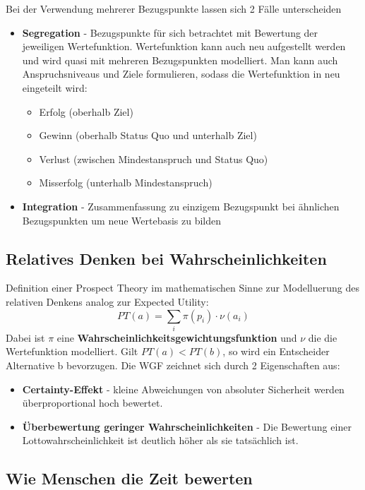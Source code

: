 Bei der Verwendung mehrerer Bezugspunkte lassen sich 2 Fälle unterscheiden
\begin{itemize}
    \item \textbf{Segregation} - Bezugspunkte für sich betrachtet mit
        Bewertung der jeweiligen Wertefunktion. Wertefunktion kann auch
        neu aufgestellt werden und wird quasi mit mehreren Bezugspunkten
        modelliert. Man kann auch Anspruchsniveaus und Ziele formulieren,
        sodass die Wertefunktion in neu eingeteilt wird:
        \begin{itemize}
            \item Erfolg (oberhalb Ziel)
            \item Gewinn (oberhalb Status Quo und unterhalb Ziel)
            \item Verlust (zwischen Mindestanspruch und Status Quo)
            \item Misserfolg (unterhalb Mindestanspruch)
        \end{itemize}
    \item \textbf{Integration} - Zusammenfassung zu einzigem Bezugspunkt bei
        ähnlichen Bezugspunkten um neue Wertebasis zu bilden
\end{itemize}

\subsection{Relatives Denken bei Wahrscheinlichkeiten}
Definition einer Prospect Theory im mathematischen Sinne zur Modelluerung
des relativen Denkens analog zur Expected Utility:
\begin{equation}
    PT(a) = \sum_i \pi(p_i) \cdot \nu(a_i)
\end{equation}
Dabei ist $\pi$ eine \textbf{Wahrscheinlichkeitsgewichtungsfunktion} und $\nu$
die die Wertefunktion modelliert.
Gilt $PT(a) < PT(b)$, so wird ein Entscheider Alternative b bevorzugen.
Die WGF zeichnet sich durch 2 Eigenschaften aus:
\begin{itemize}
    \item \textbf{Certainty-Effekt} - kleine Abweichungen von absoluter Sicherheit
        werden überproportional hoch bewertet.
    \item \textbf{Überbewertung geringer Wahrscheinlichkeiten} - Die Bewertung
        einer Lottowahrscheinlichkeit ist deutlich höher als sie tatsächlich ist.
\end{itemize}

\subsection{Wie Menschen die Zeit bewerten}
